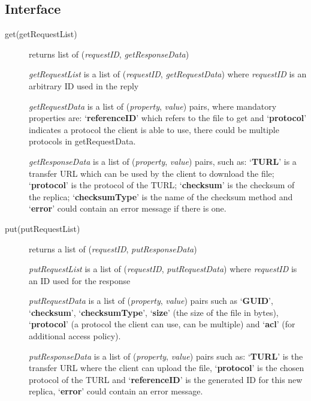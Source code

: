 \documentclass{book}
\begin{document}



\subsection{Interface} %

\begin{description}
    \item[get(getRequestList)] returns list of (\emph{requestID}, \emph{getResponseData})
    
    \emph{getRequestList} is a list of (\emph{requestID}, \emph{getRequestData}) where \emph{requestID} is an arbitrary ID used in the reply
    
    \emph{getRequestData} is a list of (\emph{property}, \emph{value}) pairs, where mandatory properties are: `\textbf{referenceID}' which refers to the file to get and `\textbf{protocol}' indicates a protocol the client is able to use, there could be multiple protocols in getRequestData.
    
    \emph{getResponseData} is a list of (\emph{property}, \emph{value}) pairs, such as: `\textbf{TURL}' is a transfer URL which can be used by the client to download the file; `\textbf{protocol}' is the protocol of the TURL; `\textbf{checksum}' is the checksum of the replica; `\textbf{checksumType}' is the name of the checksum method and `\textbf{error}' could contain an error message if there is one.
     
    \item[put(putRequestList)] returns a list of (\emph{requestID}, \emph{putResponseData})
    
    \emph{putRequestList} is a list of (\emph{requestID}, \emph{putRequestData}) where \emph{requestID} is an ID used for the response
    
    \emph{putRequestData} is a list of (\emph{property}, \emph{value}) pairs such as `\textbf{GUID}', `\textbf{checksum}', `\textbf{checksumType}', `\textbf{size}' (the size of the file in bytes), `\textbf{protocol}' (a protocol the client can use, can be multiple) and `\textbf{acl}' (for additional access policy).
    
    \emph{putResponseData} is a list of (\emph{property}, \emph{value}) pairs such as: `\textbf{TURL}' is the transfer URL where the client can upload the file, `\textbf{protocol}' is the chosen protocol of the TURL and `\textbf{referenceID}' is the generated ID for this new replica, `\textbf{error}' could contain an error message.
    

\end{description}
\end{document}
